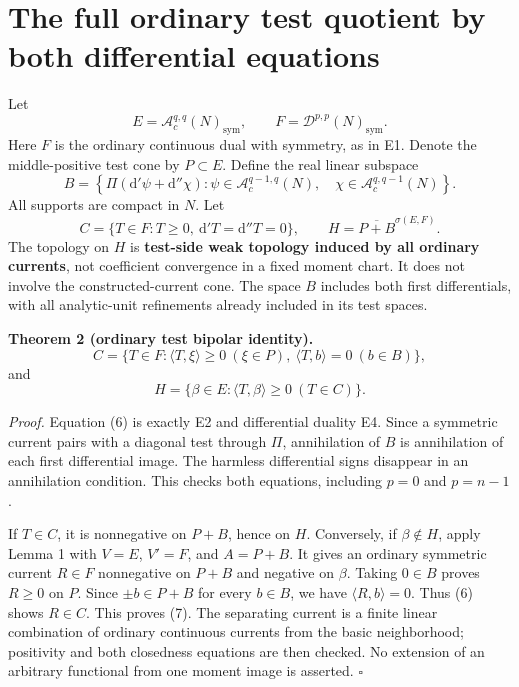 \documentclass[
  11pt,
]{article}
\begin{document}
\section{The full ordinary test quotient by both differential
equations}\label{the-full-ordinary-test-quotient-by-both-differential-equations}

Let \[ E=\mathcal A_c^{q,q}(N)_{\mathrm{sym}},\qquad
 F=\mathcal D^{p,p}(N)_{\mathrm{sym}}.\] Here \(F\) is the ordinary
continuous dual with symmetry, as in E1. Denote the middle-positive test
cone by \(P\subset E\). Define the real linear subspace \[
 B=\left\{\Pi(\mathrm d'\psi+\mathrm d''\chi):
 \psi\in\mathcal A_c^{q-1,q}(N),\quad
 \chi\in\mathcal A_c^{q,q-1}(N)\right\}.                    \tag{4}
\] All supports are compact in \(N\). Let
\[ C=\{T\in F:T\geq0,\ \mathrm d'T=\mathrm d''T=0\},\qquad
 H=\overline{P+B}^{\sigma(E,F)}.                            \tag{5}
\] The topology on \(H\) is \textbf{test-side weak topology induced by
all ordinary currents}, not coefficient convergence in a fixed moment
chart. It does not involve the constructed-current cone. The space \(B\)
includes both first differentials, with all analytic-unit refinements
already included in its test spaces.

\textbf{Theorem 2 (ordinary test bipolar identity).} \[
 C=\{T\in F:\langle T,\xi\rangle\geq0\ (\xi\in P),\
                        \langle T,b\rangle=0\ (b\in B)\},  \tag{6}
\] and \[
 H=\{\beta\in E:\langle T,\beta\rangle\geq0\ (T\in C)\}.
                                                               \tag{7}
\]

\emph{Proof.} Equation (6) is exactly E2 and differential duality E4.
Since a symmetric current pairs with a diagonal test through \(\Pi\),
annihilation of \(B\) is annihilation of each first differential image.
The harmless differential signs disappear in an annihilation condition.
This checks both equations, including \(p=0\) and \(p=n-1\).

If \(T\in C\), it is nonnegative on \(P+B\), hence on \(H\). Conversely,
if \(\beta\notin H\), apply Lemma 1 with \(V=E\), \(V'=F\), and
\(A=P+B\). It gives an ordinary symmetric current \(R\in F\) nonnegative
on \(P+B\) and negative on \(\beta\). Taking \(0\in B\) proves
\(R\geq0\) on \(P\). Since \(\pm b\in P+B\) for every \(b\in B\), we
have \(\langle R,b\rangle=0\). Thus (6) shows \(R\in C\). This proves
(7). The separating current is a finite linear combination of ordinary
continuous currents from the basic neighborhood; positivity and both
closedness equations are then checked. No extension of an arbitrary
functional from one moment image is asserted. \(\square\)
\end{document}
